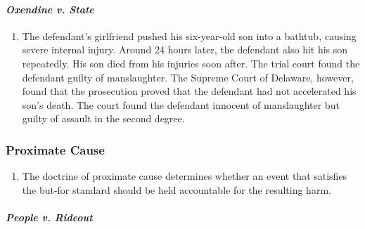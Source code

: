 \paragraph{\emph{Oxendine v. State}}

\begin{enumerate}
    \item The defendant's girlfriend pushed his six-year-old son into a bathtub, causing severe internal injury. Around 24 hours later, the defendant also hit his son repeatedly. His son died from his injuries soon after. The trial court found the defendant guilty of manslaughter. The Supreme Court of Delaware, however, found that the prosecution proved that the defendant had not accelerated his son's death. The court found the defendant innocent of manslaughter but guilty of assault in the second degree.
\end{enumerate}

\subsubsection{Proximate Cause} 

\begin{enumerate}
    \item The doctrine of proximate cause determines whether an event that satisfies the but-for standard should be held accountable for the resulting harm.
\end{enumerate}

\paragraph{\emph{People v. Rideout}}

